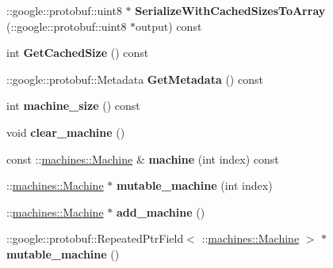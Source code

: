 \begin{DoxyCompactItemize}
\item 
\+::google\+::protobuf\+::uint8 $\ast$ {\bfseries Serialize\+With\+Cached\+Sizes\+To\+Array} (\+::google\+::protobuf\+::uint8 $\ast$output) const \hypertarget{classmachines_1_1machinelist_a04bd905536c6df6d42d76e349a97f561}{}\label{classmachines_1_1machinelist_a04bd905536c6df6d42d76e349a97f561}

\item 
int {\bfseries Get\+Cached\+Size} () const \hypertarget{classmachines_1_1machinelist_aff60075cd222fb701216d18d6829d882}{}\label{classmachines_1_1machinelist_aff60075cd222fb701216d18d6829d882}

\item 
\+::google\+::protobuf\+::\+Metadata {\bfseries Get\+Metadata} () const \hypertarget{classmachines_1_1machinelist_a8eed61afd4c0f02caecb24a4196dc2ce}{}\label{classmachines_1_1machinelist_a8eed61afd4c0f02caecb24a4196dc2ce}

\item 
int {\bfseries machine\+\_\+size} () const \hypertarget{classmachines_1_1machinelist_a510f4af329708690aff88485d693969c}{}\label{classmachines_1_1machinelist_a510f4af329708690aff88485d693969c}

\item 
void {\bfseries clear\+\_\+machine} ()\hypertarget{classmachines_1_1machinelist_ad7becd9ea5e7e6fd3ba2d7fa8b2afea3}{}\label{classmachines_1_1machinelist_ad7becd9ea5e7e6fd3ba2d7fa8b2afea3}

\item 
const \+::\hyperlink{classmachines_1_1Machine}{machines\+::\+Machine} \& {\bfseries machine} (int index) const \hypertarget{classmachines_1_1machinelist_a629756ed1e1237f7559bd0bde3204f87}{}\label{classmachines_1_1machinelist_a629756ed1e1237f7559bd0bde3204f87}

\item 
\+::\hyperlink{classmachines_1_1Machine}{machines\+::\+Machine} $\ast$ {\bfseries mutable\+\_\+machine} (int index)\hypertarget{classmachines_1_1machinelist_a63425cd579b78f212451cdc428e745ff}{}\label{classmachines_1_1machinelist_a63425cd579b78f212451cdc428e745ff}

\item 
\+::\hyperlink{classmachines_1_1Machine}{machines\+::\+Machine} $\ast$ {\bfseries add\+\_\+machine} ()\hypertarget{classmachines_1_1machinelist_aa62e554f3e471d13fc1b3f520d504aea}{}\label{classmachines_1_1machinelist_aa62e554f3e471d13fc1b3f520d504aea}

\item 
\+::google\+::protobuf\+::\+Repeated\+Ptr\+Field$<$ \+::\hyperlink{classmachines_1_1Machine}{machines\+::\+Machine} $>$ $\ast$ {\bfseries mutable\+\_\+machine} ()\hypertarget{classmachines_1_1machinelist_a65e0b020a745693c72bc34b820069eb2}{}\label{classmachines_1_1machinelist_a65e0b020a745693c72bc34b820069eb2}


\end{DoxyCompactItemize}
